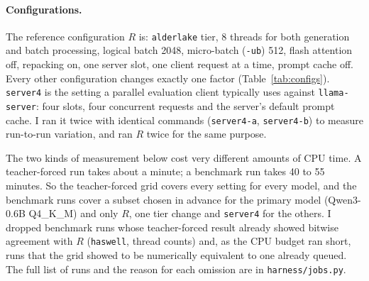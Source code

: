 \paragraph{Configurations.}
The reference configuration $R$ is: \texttt{alderlake} tier, 8 threads for both generation and
batch processing, logical batch 2048, micro-batch (\texttt{-ub}) 512, flash attention off,
repacking on, one server slot, one client request at a time, prompt cache off. Every other
configuration changes exactly one factor (Table~\ref{tab:configs}). \texttt{server4} is the
setting a parallel evaluation client typically uses against \texttt{llama-server}: four slots,
four concurrent requests and the server's default prompt cache. I ran it twice with identical
commands (\texttt{server4-a}, \texttt{server4-b}) to measure run-to-run variation, and ran $R$
twice for the same purpose.

The two kinds of measurement below cost very different amounts of CPU time. A teacher-forced
run takes about a minute; a benchmark run takes 40 to 55 minutes. So the teacher-forced grid
covers every setting for every model, and the benchmark runs cover a subset chosen in advance
for the primary model (Qwen3-0.6B Q4\_K\_M) and only $R$, one tier change and \texttt{server4}
for the others. I dropped benchmark runs whose teacher-forced result already showed bitwise
agreement with $R$ (\texttt{haswell}, thread counts) and, as the CPU budget ran short, runs that
the grid showed to be numerically equivalent to one already queued. The full list of runs and
the reason for each omission are in \texttt{harness/jobs.py}.

